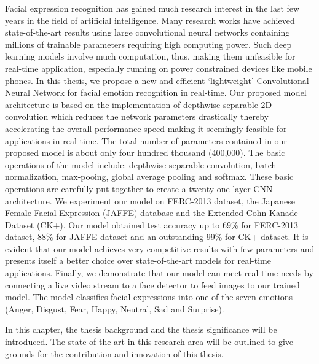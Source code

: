 \documentclass[master]{thesis-uestc}
\begin{document}
\begin{englishabstract}
Facial expression recognition has gained much research interest in the last few years in the field of artificial intelligence. Many research works have achieved state-of-the-art results using large convolutional neural networks containing millions of trainable parameters requiring high computing power. Such deep learning models involve much computation, thus, making them unfeasible for real-time application, especially running on power constrained devices like mobile phones. In this thesis, we propose a new and efficient `lightweight' Convolutional Neural Network for facial emotion recognition in real-time. Our proposed model architecture is based on the implementation of depthwise separable 2D convolution which reduces the network parameters drastically thereby accelerating the overall performance speed making it seemingly feasible for applications in real-time. The total number of parameters contained in our proposed model is about only four hundred thousand (400,000). The basic operations of the model include: depthwise separable convolution, batch normalization, max-pooing, global average pooling and softmax. These basic operations are carefully put together to create a twenty-one layer CNN architecture. We experiment our model on FERC-2013 dataset, the Japanese Female Facial Expression (JAFFE) database and the Extended Cohn-Kanade Dataset (CK+). Our model obtained test accuracy up to 69\% for FERC-2013 dataset, 88\% for JAFFE dataset and an outstanding 99\% for CK+ dataset. It is evident that our model achieves very competitive results with few parameters and presents itself a better choice over state-of-the-art models for real-time applications. Finally, we demonstrate that our model can meet real-time needs by connecting a live video stream to a face detector to feed images to our trained model. The model classifies facial expressions into one of the seven emotions (Anger, Disgust, Fear, Happy, Neutral, Sad and Surprise).

\end{englishabstract}

\thesistableofcontents
\thesisfigurelist
\thesistablelist

\thesischapterexordium

In this chapter, the thesis background and the thesis significance will be introduced. The state-of-the-art in this research area will be outlined to give grounds for the contribution and innovation of this thesis. 
\end{document}
